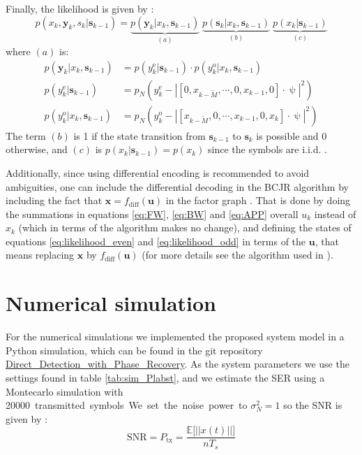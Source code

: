 Finally, the likelihood is given by \cite{Plabst_DD}:
\begin{equation}
p(x_k,\bm y_k,s_k|\bm s_{k-1})=\underbrace{p(\bm y_k|x_k,\bm s_{k-1})}_{(a)}\;
\underbrace{p(\bm s_k|x_k,\bm s_{k-1})}_{(b)}\;
\underbrace{p(x_k|\bm s_{k-1})}_{(c)}
\end{equation}
where $(a)$ is:
\begin{align}
	p(\bm y_k|x_k,\bm s_{k-1})&=p(y_k^\text{e}|\bm s_{k-1})\cdot p(y_k^\text{o}|x_k,\bm s_{k-1})\\
	p(y_k^\text{e}|\bm s_{k-1})&=p_N\left(y_k^\text{e}-\left| [0,x_{k-\widetilde{M}},\cdots,0,x_{k-1},0]\cdot\uppsi\right|^2\right)
	\label{eq:likelihood_even}\\
	p(y_k^\text{o}|x_k,\bm s_{k-1})&=p_N\left(y_k^\text{o}-\left| [x_{k-\widetilde{M}},0,\cdots,x_{k-1},0,x_{k}]\cdot\uppsi\right|^2\right)
	\label{eq:likelihood_odd}
\end{align}
The term $(b)$ is 1 if the state transition from $\bm s_{k-1}$ to $\bm s_{k}$ is possible and 0 otherwise, and $(c)$ is $p(x_k|\bm s_{k-1})=p(x_k)$ since the symbols are i.i.d. \cite{Plabst_DD}.

Additionally, since using differential encoding is recommended to avoid ambiguities, one can include the differential decoding in the BCJR algorithm by including the fact that $\bm x=f_\text{diff}(\bm u)$ in the factor graph \cite{Plabst_DD}. That is done by doing the summations in equations \ref{eq:FW}, \ref{eq:BW} and \ref{eq:APP} overall $u_k$ instead of $x_k$ (which in terms of the algorithm makes no change), and defining the states of equations \ref{eq:likelihood_even} and \ref{eq:likelihood_odd} in terms of the $\bm u$, that means replacing $\bm x$ by $f_\text{diff}(\bm u)$ (for more details see the algorithm used in \cite{Wang}).  


\section{Numerical simulation}
For the numerical simulations we implemented the proposed system model in a Python simulation, which can be found in the git repository \href{https://github.com/dfigueroa11/Direct_Detection_with_Phase_Recovery.git}{Direct\_Detection\_with\_Phase\_Recovery}. As the system parameters we use the settings found in table \ref{tab:sim_Plabst}, and we estimate the SER using a Montecarlo simulation with \SI{20000} transmitted symbols. We set the noise power to $\sigma_N^2=1$ so the SNR is given by \cite{Plabst_DD}:
\begin{equation}
\text{SNR}=P_\text{tx}=\frac{\mathds{E}\bigl[ ||x(t)||\bigr]}{nT_s}
\end{equation}
%

